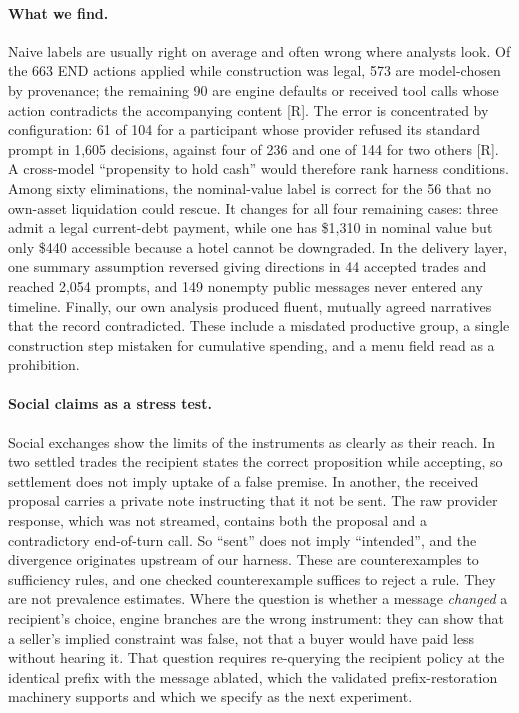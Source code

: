 \paragraph{What we find.}
Naive labels are usually right on average and often wrong where analysts look. Of the
663 END actions applied while construction was legal, 573 are model-chosen by provenance;
the remaining 90 are engine defaults or received tool calls whose action contradicts the
accompanying content [R]. The error is concentrated by configuration: 61 of 104 for a
participant whose provider refused its standard prompt in 1,605 decisions, against four
of 236 and one of 144 for two others [R]. A cross-model ``propensity to hold cash'' would
therefore rank harness conditions. Among sixty eliminations, the nominal-value label is
correct for the 56 that no own-asset liquidation could rescue. It changes for all four
remaining cases: three admit a legal current-debt payment, while one has \$1,310 in nominal
value but only \$440 accessible because a hotel cannot be downgraded. In the delivery
layer, one summary assumption reversed giving directions in 44 accepted trades and
reached 2,054 prompts, and 149 nonempty public messages never entered any timeline.
Finally, our own analysis produced fluent, mutually agreed narratives that the record
contradicted. These include a misdated productive group, a single construction step
mistaken for cumulative spending, and a menu field read as a prohibition.

\paragraph{Social claims as a stress test.}
Social exchanges show the limits of the instruments as clearly as their reach. In two
settled trades the recipient states the correct proposition while accepting, so
settlement does not imply uptake of a false premise. In another, the received proposal
carries a private note instructing that it not be sent. The raw provider response,
which was not streamed, contains both the proposal and a contradictory end-of-turn call.
So ``sent'' does not imply ``intended'', and the divergence originates upstream of our
harness. These are counterexamples to sufficiency rules, and one checked counterexample
suffices to reject a rule. They are not prevalence estimates. Where the question is
whether a message \emph{changed} a recipient's choice, engine branches are the wrong
instrument: they can show that a seller's implied constraint was false, not that a buyer
would have paid less without hearing it. That question requires re-querying the
recipient policy at the identical prefix with the message ablated, which the validated
prefix-restoration machinery supports and which we specify as the next experiment.

